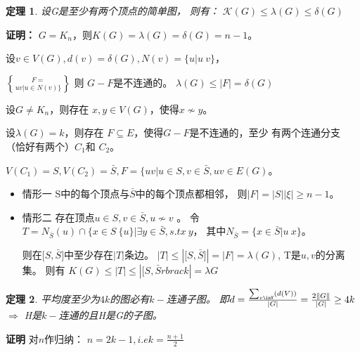 \documentclass[UTF8]{ctexart}
\newtheorem{thm}{定理}
\begin{document}
    \begin{thm}
    设G是至少有两个顶点的简单图，
    则有：
    $ \mathcal{K}(G)  \leq \lambda(G)  \leq \delta(G)$
    \end{thm}
    
    \textbf{证明：}
    $ G=K_{n} $，则$ \mathit{K}(G)=\lambda(G)=\delta(G)=n-1$。
    
    设$ v \in V(G), d(v)=\delta(G), N(v) = \lbrace u| u~v \rbrace $，
    
    $ F = \brace uv|u \in N(v) \rbrace $ 则 $G-F$是不连通的。
    $\lambda(G) \leq |F|= \delta(G) $
    
    设$ G \neq K_{n}$，则存在 $ x,y \in V(G) $，使得$x \not\sim y$。
    
    设$ \lambda(G)=k $，则存在 $ F \subseteq E $，使得$G-F$是不连通的，至少
    有两个连通分支（恰好有两个）$ C_{1}$和 $ C_{2}$。
    
    $V(C_{1})=S, V(C_{2})=\bar{S}, F= \lbrace uv| u \in S, v \in \bar{S}, uv \in E(G)$。
    
    \begin{itemize}
    \item 情形一 S中的每个顶点与$ \bar{S} $中的每个顶点都相邻，
    则$|F| = |S||\xi| \geq n-1$。
    \item 情形二 存在顶点$u\in S,v \in \bar{S}, u\not\sim v$  。
    令$T=N_{\bar{S}}(u) \cap \lbrace x\in S \ \lbrace u \rbrace | \exists y \in \bar{S}, s.t x~y$，
    其中$N_{\bar{S}}= \lbrace x \in \bar{S} | u~x \rbrace$。
    
    则在$\lbrack S,\bar{S} \rbrack $中至少存在$|T|$条边。
    $|T| \leq | \lbrack S, \bar{S} \rbrack | = |F| = \lambda(G) $,
    T是$u,v$的分离集。
    则有 $\mathit{K}(G) \leq |T| \leq | \lbrack S, \bar{S} rbrack | = \lambda{G}  $
    
    \end{itemize}
    
    \begin{thm}
    平均度至少为$4k$的图必有$k-$连通子图。
    即$d = \frac{ \sum_{ v\inV }( d(V) ) }{|G|} = \frac{2\| G \|}{|G|} \geq 4k$
    $\Longrightarrow$
    H是$k-$连通的且H是G的子图。
    \end{thm}
    
    \textbf{证明}
    对$n$作归纳：
    $n=2k-1 ,i.e k = \frac{n+1}{2} $ 
    
\end{document}
